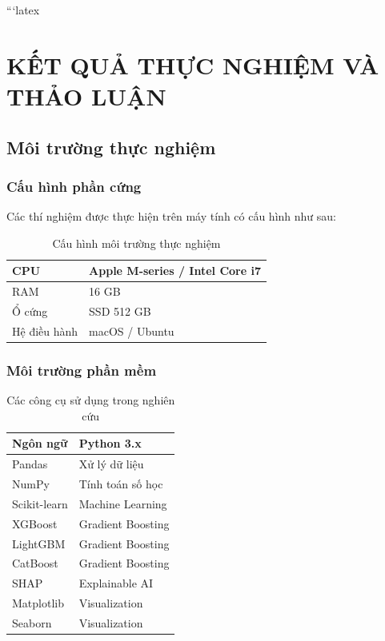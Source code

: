 ```latex
\chapter{KẾT QUẢ THỰC NGHIỆM VÀ THẢO LUẬN}

\section{Môi trường thực nghiệm}

\subsection{Cấu hình phần cứng}

Các thí nghiệm được thực hiện trên máy tính có cấu hình như sau:

\begin{table}[H]
\centering
\caption{Cấu hình môi trường thực nghiệm}
\begin{tabular}{|l|l|}
\hline
CPU & Apple M-series / Intel Core i7 \\
\hline
RAM & 16 GB \\
\hline
Ổ cứng & SSD 512 GB \\
\hline
Hệ điều hành & macOS / Ubuntu \\
\hline
\end{tabular}
\end{table}

\subsection{Môi trường phần mềm}

\begin{table}[H]
\centering
\caption{Các công cụ sử dụng trong nghiên cứu}
\begin{tabular}{|l|l|}
\hline
Ngôn ngữ & Python 3.x \\
\hline
Pandas & Xử lý dữ liệu \\
\hline
NumPy & Tính toán số học \\
\hline
Scikit-learn & Machine Learning \\
\hline
XGBoost & Gradient Boosting \\
\hline
LightGBM & Gradient Boosting \\
\hline
CatBoost & Gradient Boosting \\
\hline
SHAP & Explainable AI \\
\hline
Matplotlib & Visualization \\
\hline
Seaborn & Visualization \\
\hline
\end{tabular}
\end{table}

